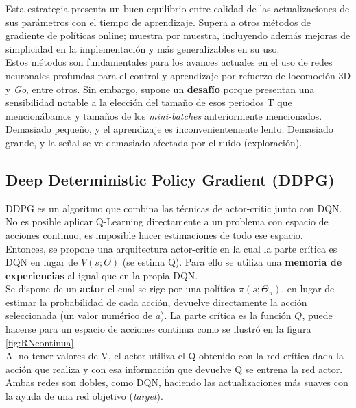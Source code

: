 \documentclass[11pt,fleqn]{book} %
\begin{document}
Esta estrategia presenta un buen equilibrio entre calidad de las actualizaciones de sus parámetros con el tiempo de aprendizaje. Supera a otros métodos de gradiente de políticas online; muestra por muestra, incluyendo además mejoras de simplicidad en la implementación y más generalizables en su uso. \\

Estos métodos son fundamentales para los avances actuales en el uso de redes neuronales profundas para el control y aprendizaje por refuerzo de locomoción 3D y \textit{Go}, entre otros. Sin embargo, supone un \textbf{desafío} porque presentan una sensibilidad notable a la elección del tamaño de esos periodos T que mencionábamos y tamaños de los \textit{mini-batches} anteriormente mencionados. Demasiado pequeño, y el aprendizaje es inconvenientemente lento. Demasiado grande, y la señal se ve demasiado afectada por el ruido (exploración). \\

\subsection{Deep Deterministic Policy Gradient (DDPG)}\label{sec:ddpg}

DDPG \cite{article:DDPG} \cite{article:DDPG_2} es un algoritmo que combina las técnicas de actor-critic junto con DQN. No es posible aplicar Q-Learning directamente a un problema con espacio de acciones continuo, es imposible hacer estimaciones de todo ese espacio. \\

Entonces, se propone una arquitectura actor-critic en la cual la parte crítica es DQN en lugar de $V(s;\Theta)$ (se estima Q). Para ello se utiliza una \textbf{memoria de experiencias} al igual que en la propia DQN. \\

Se dispone de un \textbf{actor} el cual se rige por una política $\pi(s;\Theta_\pi)$, en lugar de estimar la probabilidad de cada acción, devuelve directamente la acción seleccionada (un valor numérico de $a$). La parte crítica es la función $Q$, puede hacerse para un espacio de acciones continua como se ilustró en la figura \ref{fig:RNcontinua}. \\

Al no tener valores de V, el actor utiliza el Q obtenido con la red crítica dada la acción que realiza y con esa información que devuelve Q se entrena la red actor. Ambas redes son dobles, como DQN, haciendo las actualizaciones más suaves con la ayuda de una red objetivo (\textit{target}).\\
\end{document}
